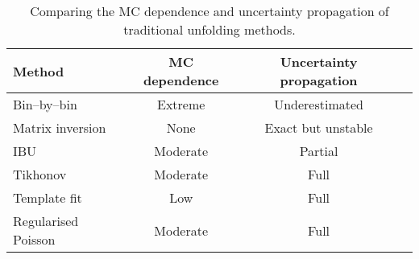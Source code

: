 \begin{table}
    \centering
    \begin{tabular}{lccc}
        \hline
        Method & MC dependence & Uncertainty propagation \\
        \hline
        Bin--by--bin & Extreme & Underestimated \\
        Matrix inversion & None & Exact but unstable \\
        IBU  & Moderate & Partial \\
        Tikhonov & Moderate & Full \\
        Template fit & Low & Full \\
        {Regularised Poisson}& Moderate & Full\\
        \hline
    \end{tabular}
    \caption{Comparing the MC dependence and uncertainty propagation of traditional unfolding methods.}
    \label{tab:binned-comp}
\end{table}

